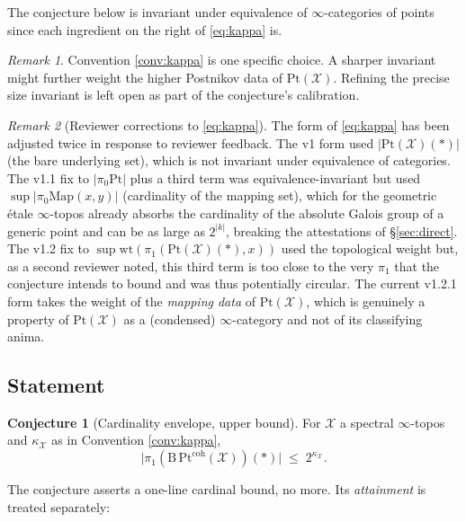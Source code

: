 \documentclass[11pt]{article}
\theoremstyle{definition}
\newtheorem{conjecture}{Conjecture}
\theoremstyle{plain}
\theoremstyle{remark}
\newtheorem*{remark}{Remark}
\newcommand{\Pt}{\mathrm{Pt}}
\newcommand{\Bcat}{\mathrm{B}}
\newcommand{\Map}{\mathrm{Map}}
\begin{document}
The conjecture below is invariant under equivalence of $\infty$-categories
of points since each ingredient on the right of \eqref{eq:kappa} is.

\begin{remark}\label{rem:kappa-coarse}
Convention \ref{conv:kappa} is one specific choice. A sharper invariant
might further weight the higher Postnikov data of $\Pt(\mathcal X)$. Refining
the precise size invariant is left open as part of the conjecture's
calibration.
\end{remark}

\begin{remark}[Reviewer corrections to \eqref{eq:kappa}]
The form of \eqref{eq:kappa} has been adjusted twice in response to
reviewer feedback. The v1 form used $|\Pt(\mathcal X)(\ast)|$ (the bare
underlying set), which is not invariant under equivalence of categories.
The v1.1 fix to $|\pi_0\Pt|$ plus a third term was equivalence-invariant
but used $\sup |\pi_0\Map(x,y)|$ (cardinality of the mapping set), which
for the geometric \'etale $\infty$-topos already absorbs the cardinality of
the absolute Galois group of a generic point and can be as large as
$2^{|k|}$, breaking the attestations of \S\ref{sec:direct}. The v1.2 fix
to $\sup \mathrm{wt}(\pi_1(\Pt(\mathcal X)(\ast),x))$ used the topological
weight but, as a second reviewer noted, this third term is too close to
the very $\pi_1$ that the conjecture intends to bound and was thus
potentially circular. The current v1.2.1 form takes the weight of the
\emph{mapping data} of $\Pt(\mathcal X)$, which is genuinely a property of
$\Pt(\mathcal X)$ as a (condensed) $\infty$-category and not of its
classifying anima.
\end{remark}

\subsection{Statement}

\begin{conjecture}[Cardinality envelope, upper bound]\label{conj:envelope}
For $\mathcal{X}$ a spectral $\infty$-topos and $\kappa_{\mathcal X}$ as in
Convention \ref{conv:kappa},
\begin{equation}
\bigl| \pi_1(\Bcat\,\Pt^{\mathrm{coh}}(\mathcal{X}))(\ast) \bigr|
\;\le\; 2^{\kappa_{\mathcal X}}.
\end{equation}
\end{conjecture}

The conjecture asserts a one-line cardinal bound, no more. Its
\emph{attainment} is treated separately:
\end{document}
